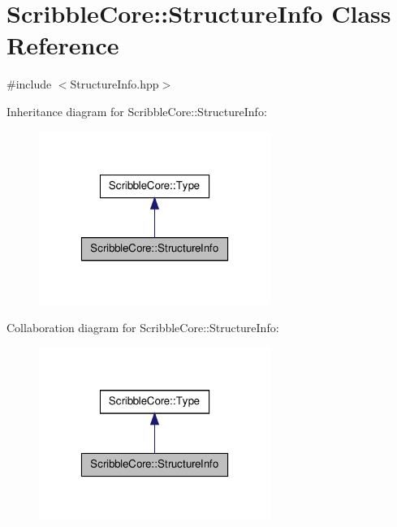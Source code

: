 \hypertarget{class_scribble_core_1_1_structure_info}{\section{Scribble\-Core\-:\-:Structure\-Info Class Reference}
\label{class_scribble_core_1_1_structure_info}
}


{\ttfamily \#include $<$Structure\-Info.\-hpp$>$}



Inheritance diagram for Scribble\-Core\-:\-:Structure\-Info\-:
\nopagebreak
\begin{figure}[H]
\begin{center}
\leavevmode
\includegraphics[width=214pt]{class_scribble_core_1_1_structure_info__inherit__graph}
\end{center}
\end{figure}


Collaboration diagram for Scribble\-Core\-:\-:Structure\-Info\-:
\nopagebreak
\begin{figure}[H]
\begin{center}
\leavevmode
\includegraphics[width=214pt]{class_scribble_core_1_1_structure_info__coll__graph}
\end{center}
\end{figure}
